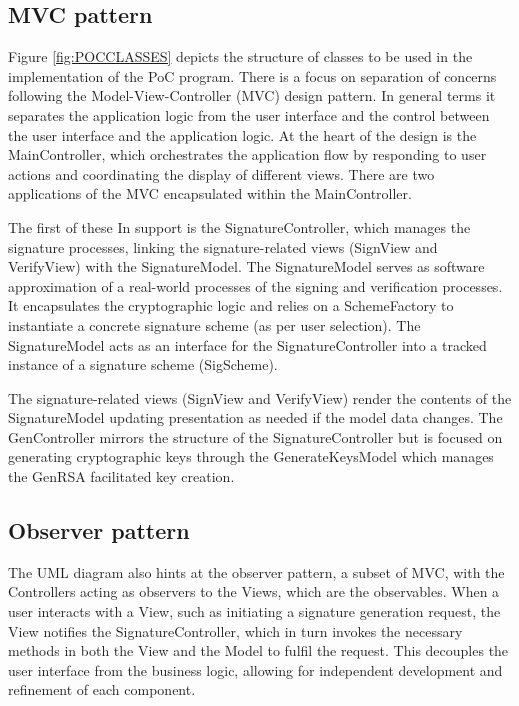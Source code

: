 \documentclass[]{final_report}
\theoremstyle{definition}
\begin{document}
\subsection{MVC pattern}
Figure \ref{fig:POCCLASSES} depicts the structure of classes to be used in the implementation of the PoC program.  There is a focus on separation of concerns following the Model-View-Controller (MVC) design pattern. In general terms it separates the application logic from the user interface and the control between the user interface and the application logic. At the heart of the design is the MainController, which orchestrates the application flow by responding to user actions and coordinating the display of different views. There are two applications of the MVC encapsulated within the MainController.

The first of these In support is the SignatureController, which manages the signature processes, linking the signature-related views (SignView and VerifyView) with the SignatureModel. The SignatureModel serves as software approximation of a real-world processes of the signing and verification processes. It encapsulates the cryptographic logic and relies on a SchemeFactory to instantiate a concrete signature scheme (as per user selection). The SignatureModel acts as an interface for the SignatureController into a tracked instance of a signature scheme (SigScheme). 

The signature-related views (SignView and VerifyView) render the contents of the SignatureModel updating presentation as needed if the model data changes.
The GenController mirrors the structure of the SignatureController but  is focused on generating cryptographic keys through the GenerateKeysModel which manages the GenRSA facilitated key creation.

\subsection{Observer pattern}
The UML diagram also hints at the observer pattern, a subset of MVC, with the Controllers acting as observers to the Views, which are the observables. When a user interacts with a View, such as initiating a signature generation request, the View notifies the SignatureController, which in turn invokes the necessary methods in both the View and the Model to fulfil the request. This decouples the user interface from the business logic, allowing for independent development and refinement of each component.
\end{document}
